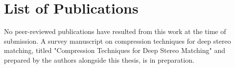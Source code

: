 \chapter{List of Publications}
\label{app:publications}

No peer-reviewed publications have resulted from this work at the time of
submission. A survey manuscript on compression techniques for deep stereo
matching, titled "Compression Techniques for Deep Stereo Matching" and
prepared by the authors alongside this thesis, is in preparation.

